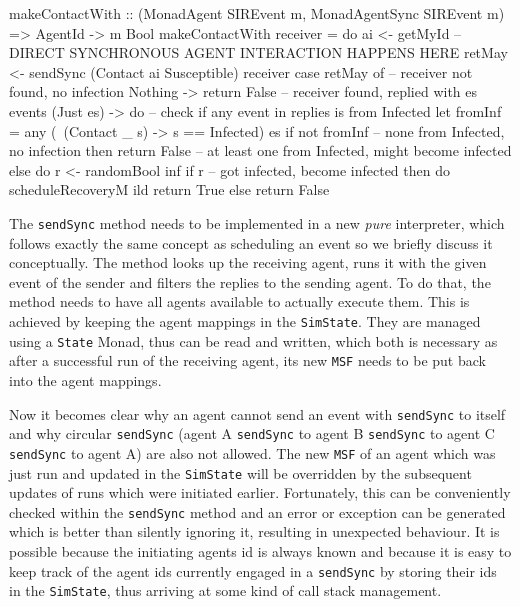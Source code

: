 \begin{HaskellCode}
makeContactWith :: (MonadAgent SIREvent m, MonadAgentSync SIREvent m) 
                => AgentId -> m Bool
makeContactWith receiver = do
  ai     <- getMyId
  -- DIRECT SYNCHRONOUS AGENT INTERACTION HAPPENS HERE
  retMay <- sendSync (Contact ai Susceptible) receiver
  case retMay of 
    -- receiver not found, no infection
    Nothing -> return False
    -- receiver found, replied with es events
    (Just es) -> do
      -- check if any event in replies is from Infected
      let fromInf = any (\ (Contact _ s) -> s == Infected) es
      if not fromInf
        -- none from Infected, no infection
        then return False
        -- at least one from Infected, might become infected
        else do
          r <- randomBool inf
          if r 
            -- got infected, become infected
            then do
              scheduleRecoveryM ild
              return True
            else return False
\end{HaskellCode}

The \texttt{sendSync} method needs to be implemented in a new \textit{pure} interpreter, which follows exactly the same concept as scheduling an event so we briefly discuss it conceptually. The method looks up the receiving agent, runs it with the given event of the sender and filters the replies to the sending agent. To do that, the method needs to have all agents available to actually execute them. This is achieved by keeping the agent mappings in the \texttt{SimState}. They are managed using a \texttt{State} Monad, thus can be read and written, which both is necessary as after a successful run of the receiving agent, its new \texttt{MSF} needs to be put back into the agent mappings.

Now it becomes clear why an agent cannot send an event with \texttt{sendSync} to itself and why circular \texttt{sendSync} (agent A \texttt{sendSync} to agent B \texttt{sendSync} to agent C \texttt{sendSync} to agent A) are also not allowed. The new \texttt{MSF} of an agent which was just run and updated in the \texttt{SimState} will be overridden by the subsequent updates of runs which were initiated earlier. Fortunately, this can be conveniently checked within the \texttt{sendSync} method and an error or exception can be generated which is better than silently ignoring it, resulting in unexpected behaviour. It is possible because the initiating agents id is always known and because it is easy to keep track of the agent ids currently engaged in a \texttt{sendSync} by storing their ids in the \texttt{SimState}, thus arriving at some kind of call stack management.

